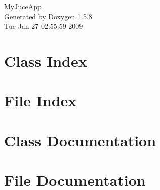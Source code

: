 \documentclass[a4paper]{book}
\begin{document}
\begin{titlepage}
\vspace*{7cm}
\begin{center}
{\Large MyJuceApp }\\
\vspace*{1cm}
{\large Generated by Doxygen 1.5.8}\\
\vspace*{0.5cm}
{\small Tue Jan 27 02:55:59 2009}\\
\end{center}
\end{titlepage}
\clearemptydoublepage
{}
\tableofcontents
\clearemptydoublepage
{}
\chapter{Class Index}

\chapter{File Index}

\chapter{Class Documentation}




\chapter{File Documentation}








\printindex
\end{document}
